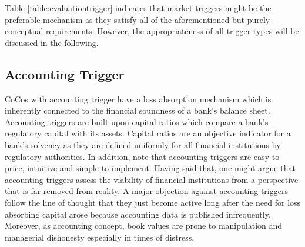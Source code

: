 Table \ref{table:evaluationtrigger} indicates that market triggers might be the preferable mechanism as they satisfy all of the aforementioned but purely conceptual requirements. However, the appropriateness of all trigger types will be discussed in the following.

\subsection{Accounting Trigger}\label{accountingtrigger}

CoCos with accounting trigger have a loss absorption mechanism which is inherently connected to the financial soundness of a bank's balance sheet. Accounting triggers are built upon capital ratios which compare a bank's regulatory capital with its assets. Capital ratios are an objective indicator for a bank's solvency as they are defined uniformly for all financial institutions by regulatory authorities. \citep{de2014handbook} In addition, \citet{pazarbasioglu2011contingent} note that accounting triggers are easy to price, intuitive and simple to implement. 
Having said that, one might argue that accounting triggers assess the viability of financial institutions from a perspective that is far-removed from reality. A major objection against accounting triggers follow the line of thought that they just become active long after the need for loss absorbing capital arose because accounting data is published infrequently. \citep{de2011pricing} Moreover, as accounting concept, book values are prone to manipulation and managerial dishonesty especially in times of distress. \citep{mcdonald2013contingent}\\ 

